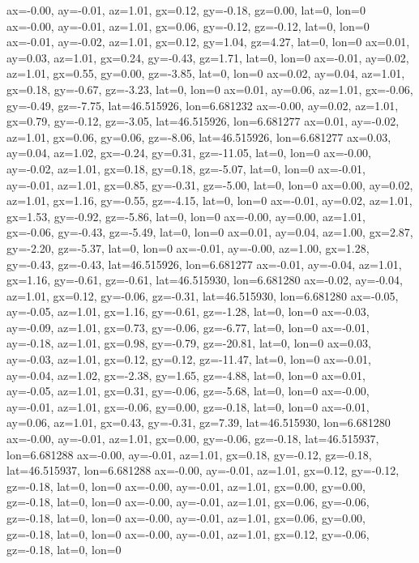 ax=-0.00, ay=-0.01, az=1.01, gx=0.12, gy=-0.18, gz=0.00, lat=0, lon=0
ax=-0.00, ay=-0.01, az=1.01, gx=0.06, gy=-0.12, gz=-0.12, lat=0, lon=0
ax=-0.01, ay=-0.02, az=1.01, gx=0.12, gy=1.04, gz=4.27, lat=0, lon=0
ax=0.01, ay=0.03, az=1.01, gx=0.24, gy=-0.43, gz=1.71, lat=0, lon=0
ax=-0.01, ay=0.02, az=1.01, gx=0.55, gy=0.00, gz=-3.85, lat=0, lon=0
ax=0.02, ay=0.04, az=1.01, gx=0.18, gy=-0.67, gz=-3.23, lat=0, lon=0
ax=0.01, ay=0.06, az=1.01, gx=-0.06, gy=-0.49, gz=-7.75, lat=46.515926, lon=6.681232
ax=-0.00, ay=0.02, az=1.01, gx=0.79, gy=-0.12, gz=-3.05, lat=46.515926, lon=6.681277
ax=0.01, ay=-0.02, az=1.01, gx=0.06, gy=0.06, gz=-8.06, lat=46.515926, lon=6.681277
ax=0.03, ay=0.04, az=1.02, gx=-0.24, gy=0.31, gz=-11.05, lat=0, lon=0
ax=-0.00, ay=-0.02, az=1.01, gx=0.18, gy=0.18, gz=-5.07, lat=0, lon=0
ax=-0.01, ay=-0.01, az=1.01, gx=0.85, gy=-0.31, gz=-5.00, lat=0, lon=0
ax=0.00, ay=0.02, az=1.01, gx=1.16, gy=-0.55, gz=-4.15, lat=0, lon=0
ax=-0.01, ay=0.02, az=1.01, gx=1.53, gy=-0.92, gz=-5.86, lat=0, lon=0
ax=-0.00, ay=0.00, az=1.01, gx=-0.06, gy=-0.43, gz=-5.49, lat=0, lon=0
ax=0.01, ay=0.04, az=1.00, gx=2.87, gy=-2.20, gz=-5.37, lat=0, lon=0
ax=-0.01, ay=-0.00, az=1.00, gx=1.28, gy=-0.43, gz=-0.43, lat=46.515926, lon=6.681277
ax=-0.01, ay=-0.04, az=1.01, gx=1.16, gy=-0.61, gz=-0.61, lat=46.515930, lon=6.681280
ax=-0.02, ay=-0.04, az=1.01, gx=0.12, gy=-0.06, gz=-0.31, lat=46.515930, lon=6.681280
ax=-0.05, ay=-0.05, az=1.01, gx=1.16, gy=-0.61, gz=-1.28, lat=0, lon=0
ax=-0.03, ay=-0.09, az=1.01, gx=0.73, gy=-0.06, gz=-6.77, lat=0, lon=0
ax=-0.01, ay=-0.18, az=1.01, gx=0.98, gy=-0.79, gz=-20.81, lat=0, lon=0
ax=0.03, ay=-0.03, az=1.01, gx=0.12, gy=0.12, gz=-11.47, lat=0, lon=0
ax=-0.01, ay=-0.04, az=1.02, gx=-2.38, gy=1.65, gz=-4.88, lat=0, lon=0
ax=0.01, ay=-0.05, az=1.01, gx=0.31, gy=-0.06, gz=-5.68, lat=0, lon=0
ax=-0.00, ay=-0.01, az=1.01, gx=-0.06, gy=0.00, gz=-0.18, lat=0, lon=0
ax=-0.01, ay=0.06, az=1.01, gx=0.43, gy=-0.31, gz=7.39, lat=46.515930, lon=6.681280
ax=-0.00, ay=-0.01, az=1.01, gx=0.00, gy=-0.06, gz=-0.18, lat=46.515937, lon=6.681288
ax=-0.00, ay=-0.01, az=1.01, gx=0.18, gy=-0.12, gz=-0.18, lat=46.515937, lon=6.681288
ax=-0.00, ay=-0.01, az=1.01, gx=0.12, gy=-0.12, gz=-0.18, lat=0, lon=0
ax=-0.00, ay=-0.01, az=1.01, gx=0.00, gy=0.00, gz=-0.18, lat=0, lon=0
ax=-0.00, ay=-0.01, az=1.01, gx=0.06, gy=-0.06, gz=-0.18, lat=0, lon=0
ax=-0.00, ay=-0.01, az=1.01, gx=0.06, gy=0.00, gz=-0.18, lat=0, lon=0
ax=-0.00, ay=-0.01, az=1.01, gx=0.12, gy=-0.06, gz=-0.18, lat=0, lon=0
